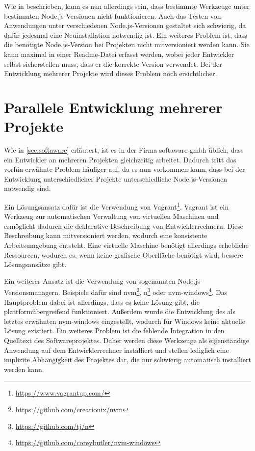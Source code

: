 Wie in \autocite{Papa.n:online} beschrieben, kann es nun allerdings sein, dass bestimmte Werkzeuge unter bestimmten Node.js-Versionen nicht funktionieren.
Auch das Testen von Anwendungen unter verschiedenen Node.js-Versionen gestaltet sich schwierig, da dafür jedesmal eine Neuinstallation notwendig ist.
Ein weiteres Problem ist, dass die benötigte Node.js-Version bei Projekten nicht mitversioniert werden kann.
Sie kann maximal in einer Readme-Datei erfasst werden, wobei jeder Entwickler selbst sicherstellen muss, dass er die korrekte Version verwendet.
Bei der Entwicklung mehrerer Projekte wird dieses Problem noch ersichtlicher.


\section{Parallele Entwicklung mehrerer Projekte}
Wie in \cref{sec:softaware} erläutert, ist es in der Firma softaware gmbh üblich, dass ein Entwickler an mehreren Projekten gleichzeitig arbeitet.
Dadurch tritt das vorhin erwähnte Problem häufiger auf, da es nun vorkommen kann, dass bei der Entwicklung unterschiedlicher Projekte unterschiedliche Node.js-Versionen notwendig sind.

Ein Lösungsansatz dafür ist die Verwendung von Vagrant\footnote{\url{https://www.vagrantup.com/}}. 
Vagrant ist ein Werkzeug zur automatischen Verwaltung von virtuellen Maschinen und ermöglicht dadurch die deklarative Beschreibung von Entwicklerrechnern.
Diese Beschreibung kann mitversioniert werden, wodurch eine konsistente Arbeitsumgebung entsteht.
Eine virtuelle Maschine benötigt allerdings erhebliche Ressourcen, wodurch es, wenn keine grafische Oberfläche benötigt wird, bessere Lösungsansätze gibt.

Ein weiterer Ansatz ist die Verwendung von sogenannten Node.js-Versionsmanagern.
Beispiele dafür sind nvm\footnote{\url{https://github.com/creationix/nvm}}, n\footnote{\url{https://github.com/tj/n}} oder nvm-windows\footnote{\url{https://github.com/coreybutler/nvm-windows}}.
Das Hauptproblem dabei ist allerdings, dass es keine Lösung gibt, die plattformübergreifend funktioniert.
Außerdem wurde die Entwicklung des als letztes erwähnten nvm-windows eingestellt, wodurch für Windows keine aktuelle Lösung existiert.
Ein weiteres Problem ist die fehlende Integration in den Quelltext des Softwareprojektes.
Daher werden diese Werkzeuge als eigenständige Anwendung auf dem Entwicklerrechner installiert und stellen lediglich eine implizite Abhängigkeit des Projektes dar, die nur schwierig automatisch installiert werden kann.

